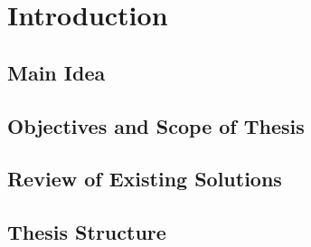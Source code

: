 \chapter{Introduction}
\section{Main Idea}
\section{Objectives and Scope of Thesis}
\section{Review of Existing Solutions}
\section{Thesis Structure}
